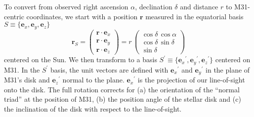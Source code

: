 \documentclass[preprint,12pt]{aastex}
\newcommand{\bvec}[1]{\ensuremath{\boldsymbol{#1}}}
\renewcommand{\vector}[1]{\ensuremath{\bvec{#1}}}
\newcommand{\uvec}[1]{\ensuremath{\vector{e}_{#1}}}
\newcommand{\ex}{\uvec{x}}
\newcommand{\ey}{\uvec{y}}
\newcommand{\ez}{\uvec{z}}
\newcommand{\epx}{\ensuremath{\uvec{x}^\prime}}
\newcommand{\epy}{\ensuremath{\uvec{y}^\prime}}
\newcommand{\epz}{\ensuremath{\uvec{z}^\prime}}
\begin{document}
To convert from observed right ascension $\alpha$, declination $\delta$ and
distance $r$ to M31-centric coordinates, we start with a position
$\vector{r}$ measured in the equatorial basis $S \equiv \{\ex,\ey,\ez\}$
\begin{equation}
    \vector{r}_S =
    \left ( \begin{array}{c}
        \vector{r} \cdot \ex \\
        \vector{r} \cdot \ey \\
        \vector{r} \cdot \ez
    \end{array} \right )
    = r \,\left ( \begin{array}{c}
        \cos \delta \, \cos \alpha \\
        \cos \delta \, \sin \delta \\
        \sin \delta
    \end{array} \right )
\end{equation}
centered on the Sun.  We then transform to a basis $S^\prime \equiv
\{\epx,\epy,\epz\}$
centered on M31. In the $S^\prime$ basis, the unit vectors are defined with
$\epx$ and $\epy$ in the plane of M31's disk and $\epz$ normal to the plane.
$\epx$ is the projection of our line-of-sight onto the disk. The full
rotation corrects for (a) the orientation of the ``normal triad'' at the
position of M31, (b) the position angle of the stellar disk and (c) the
inclination of the disk with respect to the line-of-sight.
\end{document}
